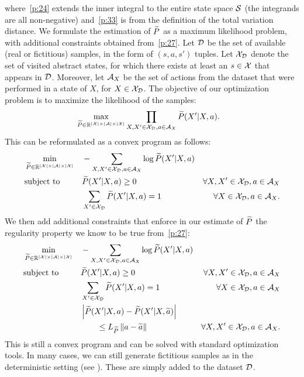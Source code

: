 where~\eqref{p:24} extends the inner integral to the entire state space $\mathcal{S}$ (the integrands are all non-negative) and~\eqref{p:33} is from the definition of the total variation distance.
We formulate the estimation of $\widetilde{P}$ as a maximum likelihood problem, with additional constraints obtained from~\eqref{p:27}.
Let $\mathcal{D}$ be the set of available (real or fictitious) samples, in the form of $(s,a,s')$ tuples. Let $\mathcal{X}_{\mathcal{D}}$ denote the set of visited abstract states, \ie for which there exists at least an $s\in\mathcal{X}$ that appears in $\mathcal{D}$. Moreover, let $\mathcal{A}_{X}$ be the set of actions from the dataset that were performed in a state of $X$, for $X\in\mathcal{X}_{\mathcal{D}}$. 
The objective of our optimization problem is to maximize the likelihood of the samples:
%
\begin{align}
&\max_{\widetilde{P}\in\mathbb{R}^{|\mathcal{X}|\times|\mathcal{A}|\times|\mathcal{X}|}} \prod_{X,X'\in\mathcal{X}_{\mathcal{D}}, a\in\mathcal{A}_{X}}\widetilde{P}(X'|X,a).
\end{align}
%
This can be reformulated as a convex program as follows:
%
\begin{align}
&\min_{\widetilde{P}\in\mathbb{R}^{|\mathcal{X}|\times|\mathcal{A}|\times|\mathcal{X}|}} &&-\sum_{X,X'\in\mathcal{X}_{\mathcal{D}}, a\in\mathcal{A}_{X}}\log\widetilde{P}(X'|X,a) \nonumber\\
&\text{subject to} &&\widetilde{P}(X'|X,a) \geq 0 &\forall X,X'\in\mathcal{X}_{\mathcal{D}}, a\in\mathcal{A}_{X} \nonumber\\
& &&\sum_{X'\in\mathcal{X}_{\mathcal{D}}}\widetilde{P}(X'|X,a) = 1 &\forall X\in\mathcal{X}_{\mathcal{D}}, a\in\mathcal{A}_{X}.
\end{align}
%
We then add additional constraints that enforce in our estimate of $\widetilde{P}$ the regularity property we know to be true from~\eqref{p:27}:
\clearpage
%
\begin{align}
&\min_{\widetilde{P}\in\mathbb{R}^{|\mathcal{X}|\times|\mathcal{A}|\times|\mathcal{X}|}} &&-\sum_{X,X'\in\mathcal{X}_{\mathcal{D}}, a\in\mathcal{A}_{X}}\log\widetilde{P}(X'|X,a) \nonumber\\
&\text{subject to} &&\widetilde{P}(X'|X,a) \geq 0 &\forall X,X'\in\mathcal{X}_{\mathcal{D}}, a\in\mathcal{A}_{X} \nonumber\\
& &&\sum_{X'\in\mathcal{X}_{\mathcal{D}}}\widetilde{P}(X'|X,a) = 1 &\forall X\in\mathcal{X}_{\mathcal{D}}, a\in\mathcal{A}_{X} \nonumber\\
& &&\left|\widetilde{P}(X'|X,a) - \widetilde{P}(X'|X,\widetilde{a})\right|& \nonumber \\
& && \qquad \leq L_{\widetilde{P}}\left\|a- \widetilde{a}\right\|_{} &\forall X,X'\in\mathcal{X}_{\mathcal{D}}, a\in\mathcal{A}_{X}. \label{p:26}
\end{align}
%
This is still a convex program and can be solved with standard optimization tools.
In many cases, we can still generate fictitious samples as in the deterministic setting (see ). These are simply added to the dataset $\mathcal{D}$. 

